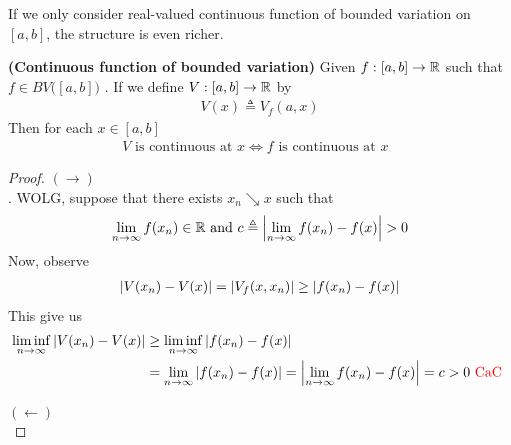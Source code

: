 \documentclass{report}
\begin{document}
\begin{mdframed}
If we only consider real-valued continuous function of bounded variation on $[a,b]$, the structure is even richer.
\end{mdframed}
\begin{theorem}
\label{Cfobv}
\textbf{(Continuous function of bounded variation)} Given $f:[a,b]\rightarrow \mathbb{R}$ such that $f\in BV\big([a,b]\big)$ . If we define $V:[a,b]\rightarrow \mathbb{R}$ by
\begin{align*}
V(x)\triangleq V_f(a,x)
\end{align*}
Then for each $x \in [a,b]$
\begin{align*}
V\text{ is continuous at }x\iff f\text{ is continuous at $x$ }
\end{align*}
\end{theorem}
\begin{proof}
$(\longrightarrow)$\\

. WOLG, suppose that there exists $x_n\searrow x$ such that
\begin{align*}
  \lim_{n\to \infty} f(x_n)\inr\text{ and }c\triangleq \abso{\lim_{n\to \infty}f(x_n)-f(x)}>0
\end{align*}
Now, observe 
\begin{align*}
\left|V(x_n)-V(x)\right|= \left|V_f(x,x_n)\right|\geq \left|f(x_n)-f(x)\right|
\end{align*}
This give us 
\begin{align*}
  \liminf_{n\to\infty} \left|V(x_n)-V(x)\right|&\geq \liminf_{n\to\infty} \left|f(x_n)-f(x)\right| \\
  &=\lim_{n\to \infty} \left|f(x_n)-f(x)\right|= \left|\lim_{n\to \infty}f(x_n)-f(x)\right|=c>0 \text{ \textcolor{red}{CaC} }
\end{align*}

$(\longleftarrow)$\\


\end{proof}
\end{document}
